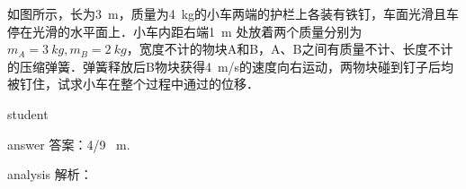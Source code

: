 \begin{example}
	如图所示，长为\SI{3}{m}，质量为\SI{4}{kg}的小车两端的护栏上各装有铁钉，车面光滑且车停在光滑的水平面上．小车内距右端\SI{1}{m} 处放着两个质量分别为$ m_A = \SI{3}{kg},m_B = \SI{2}{kg} $，宽度不计的物块A和B，A、B之间有质量不计、长度不计的压缩弹簧．弹簧释放后B物块获得\SI{4}{m/s}的速度向右运动，两物块碰到钉子后均被钉住，试求小车在整个过程中通过的位移．
	
	\begin{taggedblock}{student}
		\vspace*{2cm}
	\end{taggedblock}
	
	
	\begin{taggedblock}{answer}
		答案：4/9 ~m.
	\end{taggedblock}
	
	
	\begin{taggedblock}{analysis}
		解析：
	\end{taggedblock}
\end{example}

